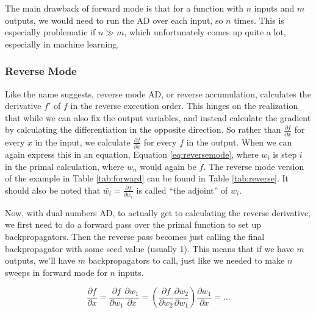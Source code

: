 \documentclass{article}
\begin{document}
                The main drawback of forward mode is that for a function with $n$ inputs and $m$ outputs, we would need to run the AD over each input, so $n$ times.
                This is especially problematic if $n\gg m$, which unfortunately comes up quite a lot, especially in machine learning.

            \subsubsection{Reverse Mode}
                Like the name suggests, reverse mode AD, or reverse accumulation, calculates the derivative $f'$ of $f$ in the reverse execution order.
                This hinges on the realization that while we can also fix the output variables, and instead calculate the gradient by calculating the differentiation in the opposite direction.
                So rather than $\tfrac{\partial f}{\partial x}$ for every $x$ in the input, we calculate $\tfrac{\partial f}{\partial x}$ for every $f$ in the output.
                When we can again express this in an equation, Equation \ref{eq:reversemode}, where $w_i$ is step $i$ in the primal calculation, where $w_n$ would again be $f$.
                The reverse mode version of the example in Table \ref{tab:forward} can be found in Table \ref{tab:reverse}.
                It should also be noted that $\bar{w_i}=\tfrac{\partial f}{\partial w_i}$ is called ``the adjoint'' of $w_i$.
                
                Now, with dual numbers AD, to actually get to calculating the reverse derivative, we first need to do a forward pass over the primal function to set up backpropagators.
                Then the reverse pass becomes just calling the final backpropagator with some seed value (usually 1).
                This means that if we have $m$ outputs, we'll have $m$ backpropagators to call, just like we needed to make $n$ sweeps in forward mode for $n$ inputs.
                
                \begin{equation} \label{eq:reversemode}
                    \frac{\partial f}{\partial x}=\frac{\partial f}{\partial w_1}\frac{\partial w_1}{\partial x}=\left(\frac{\partial f}{\partial w_2}\frac{\partial w_2}{\partial w_1}\right)\frac{\partial w_1}{\partial x}=\dots
                \end{equation}
\end{document}
